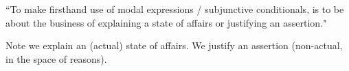 ``To make firsthand use of modal expressions / subjunctive conditionals, is to
be about the business of explaining a state of affairs or justifying an
assertion." \cite{sellars1958counterfactuals}

Note we explain an (actual) state of affairs. We justify an assertion
(non-actual, in the space of reasons).
